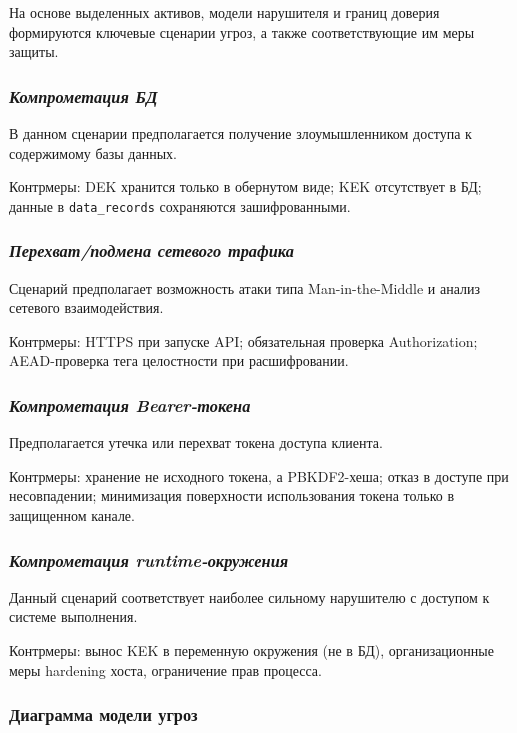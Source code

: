 \documentclass[14pt, a4paper]{extarticle}
\renewcommand{\texttt}[1]{%
  {\def\UrlFont{\ttfamily}\nolinkurl{#1}}%
}
\begin{document}
	На основе выделенных активов, модели нарушителя и границ доверия формируются ключевые сценарии угроз, а также соответствующие им меры защиты.
	
	\subsubsection*{\textit{Компрометация БД}}
	
	В данном сценарии предполагается получение злоумышленником доступа к содержимому базы данных.
	
	Контрмеры: DEK хранится только в обернутом виде; KEK отсутствует в БД; данные в \texttt{data\_records} сохраняются зашифрованными.
	
	\subsubsection*{\textit{Перехват/подмена сетевого трафика}}
	
	Сценарий предполагает возможность атаки типа Man-in-the-Middle и анализ сетевого взаимодействия.
	
	Контрмеры: HTTPS при запуске API; обязательная проверка Authorization; AEAD-проверка тега целостности при расшифровании.
	
	\subsubsection*{\textit{Компрометация Bearer-токена}}
	
	Предполагается утечка или перехват токена доступа клиента.
	
	Контрмеры: хранение не исходного токена, а PBKDF2-хеша; отказ в доступе при несовпадении; минимизация поверхности использования токена только в защищенном канале.
	
	\subsubsection*{\textit{Компрометация runtime-окружения}}
	
	Данный сценарий соответствует наиболее сильному нарушителю с доступом к системе выполнения.
	
	Контрмеры: вынос KEK в переменную окружения (не в БД), организационные меры hardening хоста, ограничение прав процесса. 
	
	\subsubsection{Диаграмма модели угроз}
	
\end{document}
